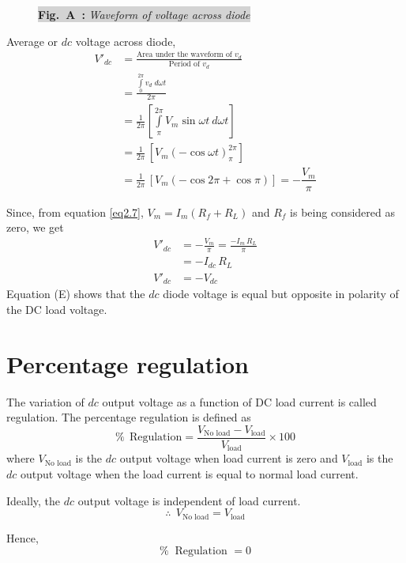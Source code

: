 \begin{solution}
\begin{figure}[H]
\smallskip

\colorbox{lightgray}{{\bf Fig.~A~:} \em Waveform of voltage across diode}
\end{figure}

Average or $dc$ voltage across diode,
\begin{align*}
V'_{dc} & = \frac{\text{Area under the waveform of
    $v_d$}}{\text{Period of $v_d$}}\\
& = \frac{\int\limits^{2\pi}_0 v_d \; d \omega t}{2 \pi}\\
& = \frac{1}{2 \pi} \left[\int\limits^{2\pi}_\pi V_m \sin \omega
  t \ d \omega t \right]\\
& = \frac{1}{2 \pi}\, [V_m (-\cos \omega t)^{2 \pi}_\pi]\\
& = \frac{1}{2 \pi}\, [V_m (-\cos 2 \pi + \cos \pi)]=-\dfrac{V_{m}}{\pi}
\end{align*}

Since, from equation \eqref{eq2.7}, $V_m = I_m (R_f + R_L)$ and $R_f$ is being
considered as zero, we get
\begin{align*}
V'_{dc} & = -\frac{V_m}{\pi} = \frac{-I_m\, R_L}{\pi}\\
& = - I_{dc}\, R_L\\
V'_{dc} & = - V_{dc} \tag{E}
\end{align*}
Equation (E) shows that the $dc$ diode voltage is equal but opposite in
polarity of the DC load voltage.
\end{solution}

\section{Percentage regulation}\label{sec2.4}

The variation of $dc$ output voltage as a function of DC load current
is called regulation. The percentage regulation is defined as 
\begin{equation}
\% ~~ \text{Regulation} = \frac{V_{\text{No load}} -
  V_{\text{load}}}{V_{\text{load}}} \times 100 \label{eq2.12}
\end{equation}
where $V_{\text{No load}}$  is the $dc$ output voltage when load
current is zero and $V_{\text{load}}$ is the $dc$ output voltage when
the load current is equal to normal load current.

Ideally, the $dc$ output voltage is independent of load current.
$$
\therefore ~~ V_{\text{No load}} = V_{\text{load}}
$$

Hence,
$$
\% ~\text{ Regulation } = 0
$$

